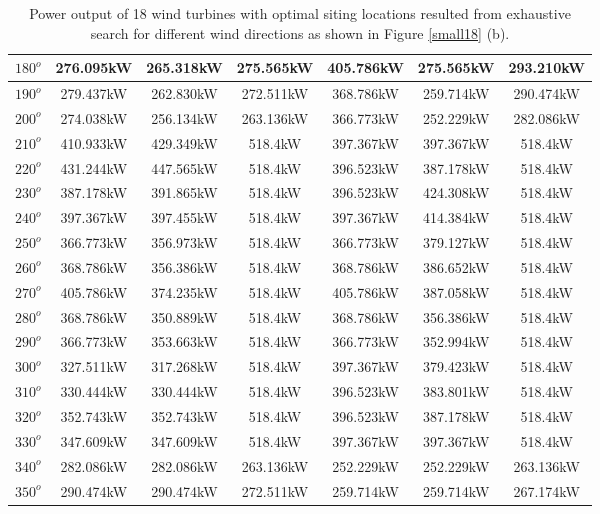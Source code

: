 \begin{table}[H]
\begin{tabular}{|c|c|c|c|c|c|c|}
		$180^o$	& 276.095kW	& 265.318kW	& 275.565kW	& 405.786kW	& 275.565kW	& 293.210kW	\\ \hline
		$190^o$	& 279.437kW	& 262.830kW	& 272.511kW	& 368.786kW	& 259.714kW	& 290.474kW	\\ \hline
		$200^o$	& 274.038kW	& 256.134kW	& 263.136kW	& 366.773kW	& 252.229kW	& 282.086kW	\\ \hline
		$210^o$	& 410.933kW	& 429.349kW	& 518.4kW	& 397.367kW	& 397.367kW	& 518.4kW	\\ \hline
		$220^o$	& 431.244kW	& 447.565kW	& 518.4kW	& 396.523kW	& 387.178kW	& 518.4kW	\\ \hline
		$230^o$	& 387.178kW	& 391.865kW	& 518.4kW	& 396.523kW	& 424.308kW	& 518.4kW	\\ \hline
		$240^o$	& 397.367kW	& 397.455kW	& 518.4kW	& 397.367kW	& 414.384kW	& 518.4kW	\\ \hline
		$250^o$	& 366.773kW	& 356.973kW	& 518.4kW	& 366.773kW	& 379.127kW	& 518.4kW	\\ \hline
		$260^o$	& 368.786kW	& 356.386kW	& 518.4kW	& 368.786kW	& 386.652kW	& 518.4kW	\\ \hline
		$270^o$	& 405.786kW	& 374.235kW	& 518.4kW	& 405.786kW	& 387.058kW	& 518.4kW	\\ \hline
		$280^o$	& 368.786kW	& 350.889kW	& 518.4kW	& 368.786kW	& 356.386kW	& 518.4kW	\\ \hline
		$290^o$	& 366.773kW	& 353.663kW	& 518.4kW	& 366.773kW	& 352.994kW	& 518.4kW	\\ \hline
		$300^o$	& 327.511kW	& 317.268kW	& 518.4kW	& 397.367kW	& 379.423kW	& 518.4kW	\\ \hline
		$310^o$	& 330.444kW	& 330.444kW	& 518.4kW	& 396.523kW	& 383.801kW	& 518.4kW	\\ \hline
		$320^o$	& 352.743kW	& 352.743kW	& 518.4kW	& 396.523kW	& 387.178kW	& 518.4kW	\\ \hline
		$330^o$	& 347.609kW	& 347.609kW	& 518.4kW	& 397.367kW	& 397.367kW	& 518.4kW	\\ \hline
		$340^o$	& 282.086kW	& 282.086kW	& 263.136kW	& 252.229kW	& 252.229kW	& 263.136kW	\\ \hline
		$350^o$	& 290.474kW	& 290.474kW	& 272.511kW	& 259.714kW	& 259.714kW	& 267.174kW	\\ \hline
        	\end{tabular}
        	\caption{Power output of 18 wind turbines with optimal siting locations resulted from exhaustive search for different wind directions as shown in Figure \ref{small18} (b).}
        	\label{table18b}
        \end{table}
